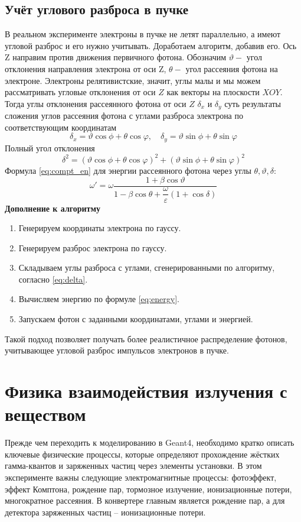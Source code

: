 \documentclass[14pt, a4paper]{extreport}
\begin{document}
\section{Учёт углового разброса в пучке}
В реальном эксперименте электроны в пучке не летят параллельно, а имеют угловой разброс и его нужно учитывать. Доработаем алгоритм, добавив его.
Ось Z направим против движения первичного фотона. Обозначим $\vartheta - $ угол отклонения направления электрона от оси Z, $\theta - $ угол рассеяния фотона на электроне. Электроны релятивистские, значит, углы малы и мы можем рассматривать угловые отклонения от оси $Z$ как векторы на плоскости $XOY$.
Тогда углы отклонения рассеянного фотона от оси $Z$ $\delta_x$ и $\delta_y$ суть результаты сложения углов рассеяния фотона с углами разброса электрона по соответствующим координатам
\begin{equation}
    \label{eq:delta}
    \delta_x = \vartheta \cos \phi +  \theta \cos \varphi, \quad \delta_y = \vartheta \sin \phi +  \theta \sin \varphi
\end{equation}
Полный угол отклонения
\begin{equation}
    \delta^2 = (\vartheta \cos \phi +  \theta \cos \varphi)^2 + (\vartheta \sin \phi +  \theta \sin \varphi)^2
\end{equation}
Формула \eqref{eq:compt_en} для энергии рассеянного фотона через углы $\theta, \vartheta,\delta$:
\begin{equation}
    \label{eq:energy}
     \omega' = \omega \dfrac{1 + \beta\cos\vartheta }{1 - \beta \cos\theta + \dfrac{\omega}{\varepsilon}\left(1+\cos \delta\right)}
\end{equation}
\textbf{Дополнение к алгоритму}
\begin{enumerate}
    \item Генерируем координаты электрона по гауссу.
    \item Генерируем разброс электрона по гауссу.
    \item Складываем углы разброса с углами, сгенерированными по алгоритму, согласно \eqref{eq:delta}.
    \item Вычисляем энергию по формуле \eqref{eq:energy}.
    \item Запускаем фотон с заданными координатами, углами и энергией.
\end{enumerate}
Такой подход позволяет получать более реалистичное распределение фотонов, учитывающее угловой разброс импульсов электронов в пучке.
\newpage
\chapter{ Физика взаимодействия излучения с веществом}
Прежде чем переходить к моделированию в Geant4, необходимо кратко описать ключевые физические процессы, которые определяют прохождение жёстких гамма-квантов и заряженных частиц через элементы установки. В этом эксперименте важны следующие электромагнитные процессы: фотоэффект, эффект Комптона, рождение пар, тормозное излучение, ионизационные потери, многократное рассеяния. В конвертере главным является рождение пар, а для детектора заряженных частиц -- ионизационные потери.
\end{document}

